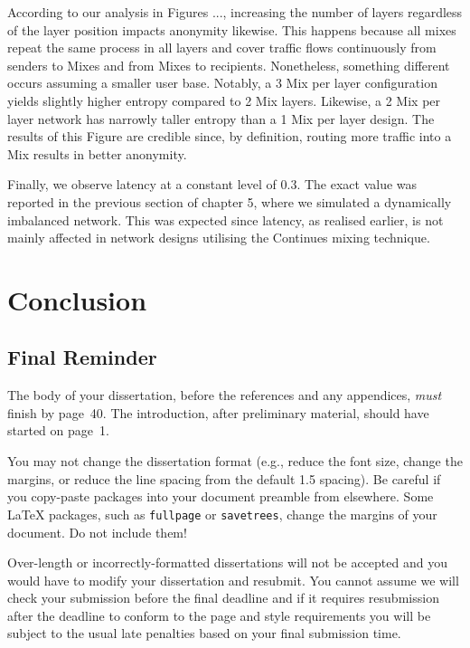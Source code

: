 \documentclass[logo,msc,cyber]{infthesis}   %
\begin{document}
According to our analysis in Figures ..., increasing the number of layers
regardless of the layer position impacts anonymity likewise. This happens
because all mixes repeat the same process in all layers and cover traffic flows
continuously from senders to Mixes and from Mixes to recipients. Nonetheless,
something different occurs assuming a smaller user base. Notably, a 3 Mix per
layer configuration yields slightly higher entropy compared to 2 Mix layers.
Likewise, a 2 Mix per layer network has narrowly taller entropy than a 1 Mix per
layer design. The results of this Figure are credible since, by definition,
routing more traffic into a Mix results in better anonymity.

Finally, we observe latency at a constant level of 0.3. The exact value was
reported in the previous section of chapter 5, where we simulated a dynamically
imbalanced network. This was expected since latency, as realised earlier, is not
mainly affected in network designs utilising the Continues mixing technique. 

\chapter{Conclusion}

\section{Final Reminder}

The body of your dissertation, before the references and any appendices,
\emph{must} finish by page~40. The introduction, after preliminary material,
should have started on page~1.

You may not change the dissertation format (e.g., reduce the font size, change
the margins, or reduce the line spacing from the default 1.5 spacing). Be
careful if you copy-paste packages into your document preamble from elsewhere.
Some \LaTeX{} packages, such as \texttt{fullpage} or \texttt{savetrees}, change
the margins of your document. Do not include them!

Over-length or incorrectly-formatted dissertations will not be accepted and you
would have to modify your dissertation and resubmit. You cannot assume we will
check your submission before the final deadline and if it requires resubmission
after the deadline to conform to the page and style requirements you will be
subject to the usual late penalties based on your final submission time.



\end{document}
